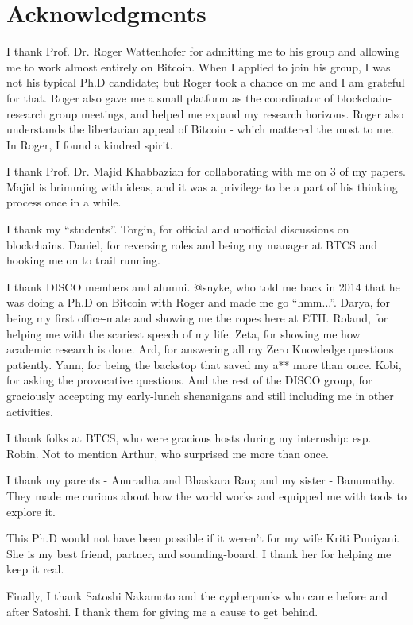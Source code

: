 \chapter*{Acknowledgments}

I thank Prof. Dr. Roger Wattenhofer for admitting me to his group and allowing me to work almost entirely on Bitcoin. When I applied to join his group, I was not his typical Ph.D candidate; but Roger took a chance on me and I am grateful for that. Roger also gave me a small platform as the coordinator of blockchain-research group meetings, and helped me expand my research horizons. Roger also understands the libertarian appeal of Bitcoin - which mattered the most to me. In Roger, I found a kindred spirit. 

I thank Prof. Dr. Majid Khabbazian for collaborating with me on 3 of my papers. Majid is brimming with ideas, and it was a privilege to be a part of his thinking process once in a while.

I thank my ``students''. Torgin, for official and unofficial discussions on blockchains. Daniel, for reversing roles and being my manager at BTCS and hooking me on to trail running. 

I thank DISCO members and alumni. @snyke, who told me back in 2014 that he was doing a Ph.D on Bitcoin with Roger and made me go ``hmm...''. Darya, for being my first office-mate and showing me the ropes here at ETH. Roland, for helping me with the scariest speech of my life. Zeta, for showing me how academic research is done. Ard, for answering all my Zero Knowledge questions patiently. Yann, for being the backstop that saved my a** more than once. Kobi, for asking the provocative questions. And the rest of the DISCO group, for graciously accepting my early-lunch shenanigans and still including me in other activities.

I thank folks at BTCS, who were gracious hosts during my internship: esp. Robin. Not to mention Arthur, who surprised me more than once.

I thank my parents - Anuradha and Bhaskara Rao; and my sister - Banumathy. They made me curious about how the world works and equipped me with tools to explore it. 

This Ph.D would not have been possible if it weren't for my wife Kriti Puniyani. She is my best friend, partner, and sounding-board. I thank her for helping me keep it real.

Finally, I thank Satoshi Nakamoto and the cypherpunks who came before and after Satoshi. I thank them for giving me a cause \cite{bitcoin_whitepaper} to get behind.

